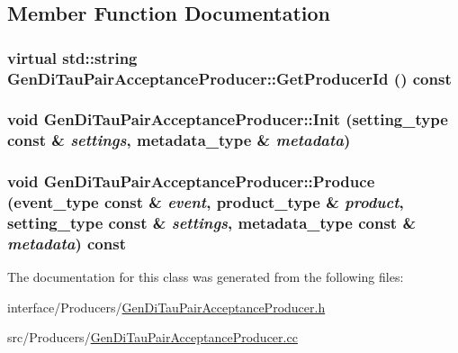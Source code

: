 \subsection{Member Function Documentation}
\hypertarget{classGenDiTauPairAcceptanceProducer_a4a26fcb67656923c42a1ae82f2ece946}{
\subsubsection[{GetProducerId}]{\setlength{\rightskip}{0pt plus 5cm}virtual std::string GenDiTauPairAcceptanceProducer::GetProducerId () const}}
\label{classGenDiTauPairAcceptanceProducer_a4a26fcb67656923c42a1ae82f2ece946}
\hypertarget{classGenDiTauPairAcceptanceProducer_ad9bb168cd309459d3477d08503756bbc}{
\subsubsection[{Init}]{\setlength{\rightskip}{0pt plus 5cm}void GenDiTauPairAcceptanceProducer::Init (setting\_\-type const \& {\em settings}, \/  metadata\_\-type \& {\em metadata})}}
\label{classGenDiTauPairAcceptanceProducer_ad9bb168cd309459d3477d08503756bbc}
\hypertarget{classGenDiTauPairAcceptanceProducer_a03cfc845e74774274efd4ea00822cd90}{
\subsubsection[{Produce}]{\setlength{\rightskip}{0pt plus 5cm}void GenDiTauPairAcceptanceProducer::Produce (event\_\-type const \& {\em event}, \/  product\_\-type \& {\em product}, \/  setting\_\-type const \& {\em settings}, \/  metadata\_\-type const \& {\em metadata}) const}}
\label{classGenDiTauPairAcceptanceProducer_a03cfc845e74774274efd4ea00822cd90}


The documentation for this class was generated from the following files:\begin{DoxyCompactItemize}
\item 
interface/Producers/\hyperlink{GenDiTauPairAcceptanceProducer_8h}{GenDiTauPairAcceptanceProducer.h}\item 
src/Producers/\hyperlink{GenDiTauPairAcceptanceProducer_8cc}{GenDiTauPairAcceptanceProducer.cc}\end{DoxyCompactItemize}
